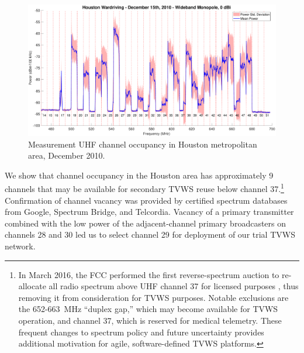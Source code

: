 \begin{figure}[ht!]
\centering
  	\includegraphics[width=1\linewidth]{figs/wardrive/Houston_UHFOnly_12_17_2010}   
   	\caption{Measurement UHF channel occupancy in Houston metropolitan area, December 2010.
	\label{fig_uhf_channel_availability}}
\end{figure}

	We show that channel occupancy in the Houston area has approximately 9 channels that may be available for secondary \ac{TVWS} reuse below channel 37.\footnote{In March 2016, the FCC performed the first reverse-spectrum auction to re-allocate all radio spectrum above UHF channel 37 for licensed purposes \cite{gomez2015broadcast}, thus removing it from consideration for \ac{TVWS} purposes. Notable exclusions are the 652-663~MHz ``duplex gap,'' which may become available for \ac{TVWS} operation, and channel 37, which is reserved for medical telemetry. These frequent changes to spectrum policy and future uncertainty provides additional motivation for agile, software-defined \ac{TVWS} platforms.}
	Confirmation of channel vacancy was provided by certified spectrum databases from Google, Spectrum Bridge, and Telcordia.
	Vacancy of a primary transmitter combined with the low power of the adjacent-channel primary broadcasters on channels 28 and 30 led us to select channel 29 for deployment of our trial \ac{TVWS} network.
	

